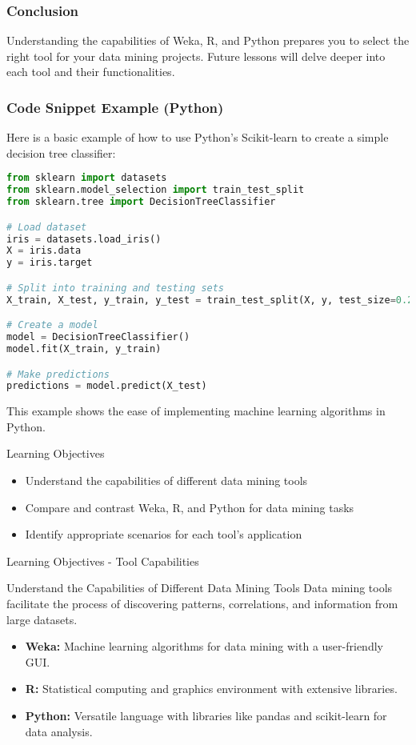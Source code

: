 \documentclass[aspectratio=169]{beamer}
\begin{document}
\begin{frame}[fragile]
    \frametitle{Conclusion}
    Understanding the capabilities of Weka, R, and Python prepares you to select the right tool for your data mining projects. Future lessons will delve deeper into each tool and their functionalities.
\end{frame}

\begin{frame}[fragile]
    \frametitle{Code Snippet Example (Python)}
    Here is a basic example of how to use Python’s Scikit-learn to create a simple decision tree classifier:
    \begin{lstlisting}[language=Python]
from sklearn import datasets
from sklearn.model_selection import train_test_split
from sklearn.tree import DecisionTreeClassifier

# Load dataset
iris = datasets.load_iris()
X = iris.data
y = iris.target

# Split into training and testing sets
X_train, X_test, y_train, y_test = train_test_split(X, y, test_size=0.2, random_state=42)

# Create a model
model = DecisionTreeClassifier()
model.fit(X_train, y_train)

# Make predictions
predictions = model.predict(X_test)
    \end{lstlisting}
    This example shows the ease of implementing machine learning algorithms in Python.
\end{frame}

\begin{frame}[fragile]{Learning Objectives}
    \begin{itemize}
        \item Understand the capabilities of different data mining tools
        \item Compare and contrast Weka, R, and Python for data mining tasks
        \item Identify appropriate scenarios for each tool's application
    \end{itemize}
\end{frame}

\begin{frame}[fragile]{Learning Objectives - Tool Capabilities}
    \begin{block}{Understand the Capabilities of Different Data Mining Tools}
        Data mining tools facilitate the process of discovering patterns, correlations, and information from large datasets.
    \end{block}

    \begin{itemize}
        \item \textbf{Weka:} Machine learning algorithms for data mining with a user-friendly GUI.
        \item \textbf{R:} Statistical computing and graphics environment with extensive libraries.
        \item \textbf{Python:} Versatile language with libraries like pandas and scikit-learn for data analysis.
    \end{itemize}
\end{frame}
\end{document}
